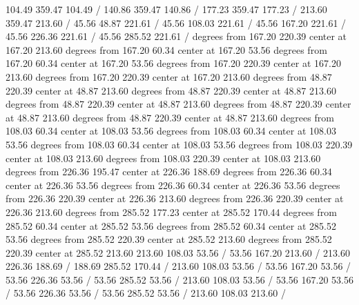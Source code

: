 {\setsolid
{} 104.49 359.47 104.49 /
\setsolid
{} 140.86 359.47 140.86 /
\setsolid
{} 177.23 359.47 177.23 /
\setsolid
{} 213.60 359.47 213.60 /
\setsolid
{} 45.56 48.87 221.61 /
\setsolid
{} 45.56 108.03 221.61 /
\setsolid
{} 45.56 167.20 221.61 /
\setsolid
{} 45.56 226.36 221.61 /
\setsolid
{} 45.56 285.52 221.61 /
 degrees from 167.20 220.39 center at 167.20 213.60
 degrees from 167.20 60.34 center at 167.20 53.56
 degrees from 167.20 60.34 center at 167.20 53.56
 degrees from 167.20 220.39 center at 167.20 213.60
 degrees from 167.20 220.39 center at 167.20 213.60
 degrees from 48.87 220.39 center at 48.87 213.60
 degrees from 48.87 220.39 center at 48.87 213.60
 degrees from 48.87 220.39 center at 48.87 213.60
 degrees from 48.87 220.39 center at 48.87 213.60
 degrees from 48.87 220.39 center at 48.87 213.60
 degrees from 108.03 60.34 center at 108.03 53.56
 degrees from 108.03 60.34 center at 108.03 53.56
 degrees from 108.03 60.34 center at 108.03 53.56
 degrees from 108.03 220.39 center at 108.03 213.60
 degrees from 108.03 220.39 center at 108.03 213.60
 degrees from 226.36 195.47 center at 226.36 188.69
 degrees from 226.36 60.34 center at 226.36 53.56
 degrees from 226.36 60.34 center at 226.36 53.56
 degrees from 226.36 220.39 center at 226.36 213.60
 degrees from 226.36 220.39 center at 226.36 213.60
 degrees from 285.52 177.23 center at 285.52 170.44
 degrees from 285.52 60.34 center at 285.52 53.56
 degrees from 285.52 60.34 center at 285.52 53.56
 degrees from 285.52 220.39 center at 285.52 213.60
 degrees from 285.52 220.39 center at 285.52 213.60
\setdashpattern <4pt, 4pt>
 213.60 108.03 53.56 /
 53.56 167.20 213.60 /
 213.60 226.36 188.69 /
 188.69 285.52 170.44 /
\setdashpattern <4pt, 4pt>
 213.60 108.03 53.56 /
 53.56 167.20 53.56 /
 53.56 226.36 53.56 /
 53.56 285.52 53.56 /
\setdashpattern <4pt, 4pt>
 213.60 108.03 53.56 /
 53.56 167.20 53.56 /
 53.56 226.36 53.56 /
 53.56 285.52 53.56 /
\setdashpattern <4pt, 4pt>
 213.60 108.03 213.60 /
}
